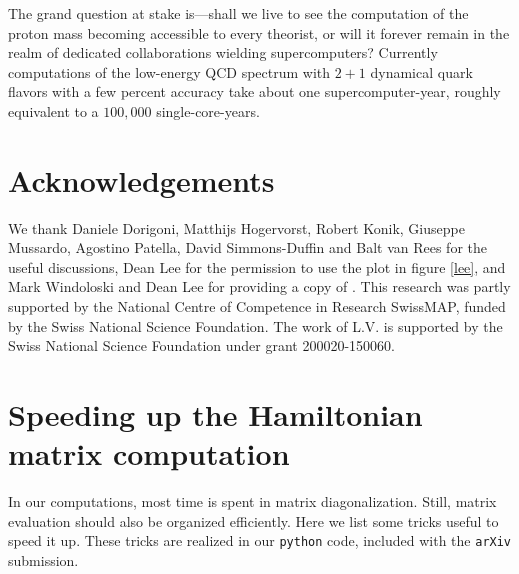 \documentclass[11pt]{article}
\numberwithin{equation}{section}
\begin{document}
The grand question at stake is---shall we live to see the computation of the proton mass becoming accessible to every theorist, or will it forever remain in the realm of dedicated collaborations wielding supercomputers?
Currently computations of the low-energy QCD spectrum with $2+1$ dynamical quark flavors with a few percent accuracy take about one supercomputer-year, roughly equivalent to a $100,000$ single-core-years. 

\section*{Acknowledgements}
We thank Daniele Dorigoni, Matthijs Hogervorst, Robert Konik, Giuseppe Mussardo, Agostino Patella, David Simmons-Duffin and Balt van Rees for the useful discussions, Dean Lee for the permission to use the plot in figure \ref{lee}, and Mark Windoloski and Dean Lee for providing a copy of \cite{Windoloski}. This research was partly supported by the National Centre of Competence in Research SwissMAP, funded by the Swiss National Science Foundation. The work of L.V. is supported by the Swiss National Science Foundation under grant 200020-150060.

\appendix
\section{Speeding up the Hamiltonian matrix computation}
\label{sec:speed}

In our computations, most time is spent in matrix diagonalization. Still, matrix evaluation should also be organized efficiently. Here we list some tricks useful to speed it up. These tricks are realized in our {\tt python} code, included with the {\tt arXiv} submission.

\nopagebreak
\end{document}
